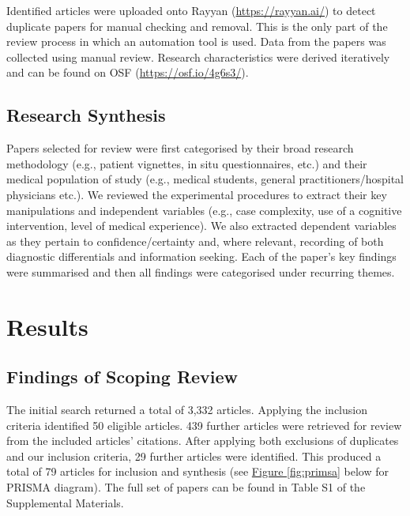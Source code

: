 \documentclass[a4paper, nobind]{templates/ociamthesis}
\begin{document}
Identified articles were uploaded onto Rayyan (\url{https://rayyan.ai/}) to detect duplicate papers for manual checking and removal. This is the only part of the review process in which an automation tool is used. Data from the papers was collected using manual review. Research characteristics were derived iteratively and can be found on OSF (\url{https://osf.io/4g6s3/}).

\subsection{Research Synthesis}\label{research-synthesis}

Papers selected for review were first categorised by their broad research methodology (e.g., patient vignettes, in situ questionnaires, etc.) and their medical population of study (e.g., medical students, general practitioners/hospital physicians etc.). We reviewed the experimental procedures to extract their key manipulations and independent variables (e.g., case complexity, use of a cognitive intervention, level of medical experience). We also extracted dependent variables as they pertain to confidence/certainty and, where relevant, recording of both diagnostic differentials and information seeking. Each of the paper's key findings were summarised and then all findings were categorised under recurring themes.

\section{Results}\label{results}

\subsection{Findings of Scoping Review}\label{findings-of-scoping-review}

The initial search returned a total of 3,332 articles. Applying the inclusion criteria identified 50 eligible articles. 439 further articles were retrieved for review from the included articles' citations. After applying both exclusions of duplicates and our inclusion criteria, 29 further articles were identified. This produced a total of 79 articles for inclusion and synthesis (see \hyperref[fig:primsa]{Figure \ref{fig:primsa}} below for PRISMA diagram). The full set of papers can be found in Table S1 of the Supplemental Materials.
\end{document}
